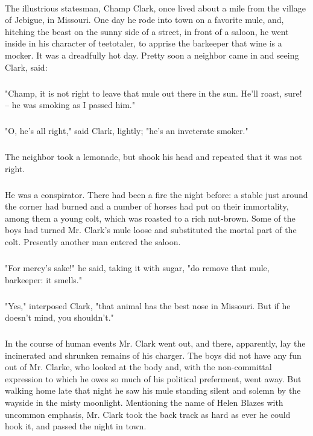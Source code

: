 \documentclass[11pt]{article}
\begin{document}
\paragraph{}   The illustrious statesman, Champ Clark, once lived about a mile
from the village of Jebigue, in Missouri.  One day he rode into town
on a favorite mule, and, hitching the beast on the sunny side of a
street, in front of a saloon, he went inside in his character of
teetotaler, to apprise the barkeeper that wine is a mocker.  It was a
dreadfully hot day.  Pretty soon a neighbor came in and seeing Clark,
said:
\subparagraph{}   "Champ, it is not right to leave that mule out there in the sun.
He'll roast, sure! -- he was smoking as I passed him."
\subparagraph{}   "O, he's all right," said Clark, lightly; "he's an inveterate
smoker."
\subparagraph{}   The neighbor took a lemonade, but shook his head and repeated that 
it was not right. 
\subparagraph{}   He was a conspirator.  There had been a fire the night before:  a 
stable just around the corner had burned and a number of horses had 
put on their immortality, among them a young colt, which was roasted
to a rich nut-brown.  Some of the boys had turned Mr. Clark's mule
loose and substituted the mortal part of the colt.  Presently another
man entered the saloon.
\subparagraph{}   "For mercy's sake!" he said, taking it with sugar, "do remove that 
mule, barkeeper:  it smells." 
\subparagraph{}   "Yes," interposed Clark, "that animal has the best nose in 
Missouri.  But if he doesn't mind, you shouldn't." 
\subparagraph{}   In the course of human events Mr. Clark went out, and there, 
apparently, lay the incinerated and shrunken remains of his charger. 
The boys did not have any fun out of Mr. Clarke, who looked at the
body and, with the non-committal expression to which he owes so much
of his political preferment, went away.  But walking home late that
night he saw his mule standing silent and solemn by the wayside in the
misty moonlight.  Mentioning the name of Helen Blazes with uncommon
emphasis, Mr. Clark took the back track as hard as ever he could hook
it, and passed the night in town.
\\
\end{document}
